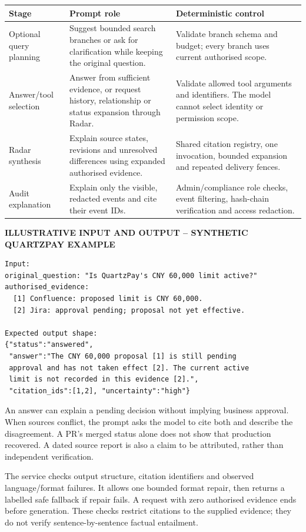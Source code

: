 \documentclass[10pt,a4paper]{article}
\newcommand{\smalllabel}[1]{{\small\bfseries\color{Teal}#1}}
\begin{document}
\begin{tabularx}{\linewidth}{@{}>{\raggedright\arraybackslash}p{29mm}YY@{}}
\toprule
\textbf{Stage} & \textbf{Prompt role} & \textbf{Deterministic control} \\
\midrule
Optional query planning & Suggest bounded search branches or ask for clarification while keeping the original question. & Validate branch schema and budget; every branch uses current authorised scope. \\
Answer/tool selection & Answer from sufficient evidence, or request history, relationship or status expansion through Radar. & Validate allowed tool arguments and identifiers. The model cannot select identity or permission scope. \\
Radar synthesis & Explain source states, revisions and unresolved differences using expanded authorised evidence. & Shared citation registry, one invocation, bounded expansion and repeated delivery fences. \\
Audit explanation & Explain only the visible, redacted events and cite their event IDs. & Admin/compliance role checks, event filtering, hash-chain verification and access redaction. \\
\bottomrule
\end{tabularx}

\smalllabel{ILLUSTRATIVE INPUT AND OUTPUT -- SYNTHETIC QUARTZPAY EXAMPLE}
\begin{lstlisting}
Input:
original_question: "Is QuartzPay's CNY 60,000 limit active?"
authorised_evidence:
  [1] Confluence: proposed limit is CNY 60,000.
  [2] Jira: approval pending; proposal not yet effective.

Expected output shape:
{"status":"answered",
 "answer":"The CNY 60,000 proposal [1] is still pending
 approval and has not taken effect [2]. The current active
 limit is not recorded in this evidence [2].",
 "citation_ids":[1,2], "uncertainty":"high"}
\end{lstlisting}

An answer can explain a pending decision without implying business approval. When sources conflict, the prompt asks the model to cite both and describe the disagreement. A PR's merged status alone does not show that production recovered. A dated source report is also a claim to be attributed, rather than independent verification.

The service checks output structure, citation identifiers and observed language/format failures. It allows one bounded format repair, then returns a labelled safe fallback if repair fails. A request with zero authorised evidence ends before generation. These checks restrict citations to the supplied evidence; they do not verify sentence-by-sentence factual entailment.
\end{document}
